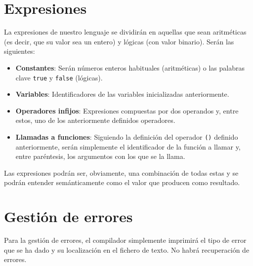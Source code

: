 \section*{Expresiones}
La expresiones de nuestro lenguaje se dividirán en aquellas que sean aritméticas
(es decir, que su valor sea un entero) y lógicas (con valor binario). Serán las
siguientes:
\begin{itemize}
    \item \textbf{Constantes}: Serán números enteros habituales (aritméticas) o
        las palabras clave \lstinline{true} y \lstinline{false} (lógicas).
    \item \textbf{Variables}: Identificadores de las variables inicializadas
        anteriormente.
    \item \textbf{Operadores infijos}: Expresiones compuestas por dos operandos
        y, entre estos, uno de los anteriormente definidos operadores.
    \item \textbf{Llamadas a funciones}: Siguiendo la definición del operador
        \lstinline{()} definido anteriormente, serán simplemente el
        identificador de la función a llamar y, entre paréntesis, los argumentos
        con los que se la llama.
\end{itemize}
Las expresiones podrán ser, obviamente, una combinación de todas estas y se
podrán entender semánticamente como el valor que producen como resultado.

\section*{Gestión de errores}
Para la gestión de errores, el compilador simplemente imprimirá el tipo de error
que se ha dado y su localización en el fichero de texto. No habrá recuperación
de errores.
